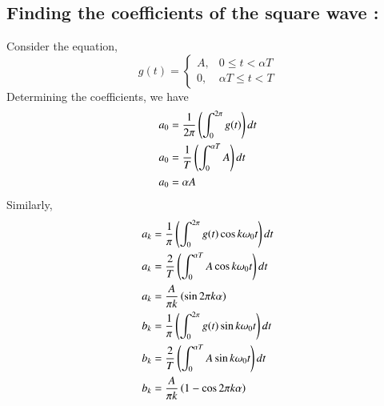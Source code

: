 \documentclass[journal]{IEEEtran}
\begin{document}
\subsection{\textbf{Finding the coefficients of the square wave } : }
Consider the equation, 
\begin{equation}
g(t) = 
\begin{cases} 
A, & 0 \leq t < \alpha T \\ 
0, & \alpha T \leq t < T
\end{cases}
\end{equation}
Determining the coefficients, we have
\begin{align*}
	a_{0} &= \frac{1}{2 \pi} \left(\int_{0}^{2 \pi} g(t)\right) dt \\
	a_{0} &= \frac{1}{T} \left(\int_{0}^{\alpha T} A\right) dt \\
	a_{0} &= \alpha A \label{eq:a0}
\end{align*}
Similarly,
\begin{align*}
	a_{k} &= \frac{1}{\pi} \left(\int_{0}^{2 \pi} g(t) \cos{k \omega_{0} t}\right) dt \\
	a_{k} &= \frac{2}{T} \left(\int_{0}^{\alpha T} A \cos{k \omega_{0} t}\right) dt \\
	a_{k} &= \frac{A}{\pi k} \left(\sin{2 \pi k \alpha}\right) \label{eq:ak} \\
	b_{k} &= \frac{1}{\pi} \left(\int_{0}^{2 \pi} g(t) \sin{k \omega_{0} t}\right) dt \\
	b_{k} &= \frac{2}{T} \left(\int_{0}^{\alpha T} A \sin{ k \omega_{0} t} \right) dt \\
	b_{k} &= \frac{A}{\pi k} \left(1 - \cos{2 \pi k \alpha}\right) \label{eq:bk}
\end{align*}
\end{document}
